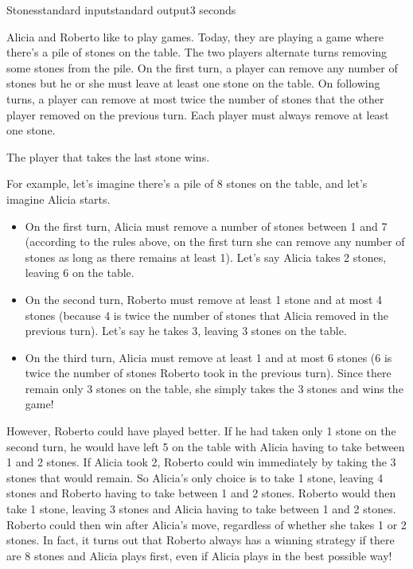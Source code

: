 \begin{problem}{Stones}{standard input}{standard output}{3 seconds}

Alicia and Roberto like to play games. Today, they are playing a game where there's a pile of stones on the table. The two players alternate turns removing some stones from the pile. On the first turn, a player can remove any number of stones but he or she must leave at least one stone on the table. On following turns, a player can remove at most twice the number of stones that the other player removed on the previous turn. Each player must always remove at least one stone.

The player that takes the last stone wins.

For example, let's imagine there's a pile of 8 stones on the table, and let's imagine Alicia starts.

\begin{itemize}
  \item{On the first turn, Alicia must remove a number of stones between 1 and 7 (according to the rules above, on the first turn she can remove any number of stones as long as there remains at least 1). Let's say Alicia takes 2 stones, leaving 6 on the table.}
  \item{On the second turn, Roberto must remove at least 1 stone and at most 4 stones (because 4 is twice the number of stones that Alicia removed in the previous turn). Let's say he takes 3, leaving 3 stones on the table.}
  \item{On the third turn, Alicia must remove at least 1 and at most 6 stones (6 is twice the number of stones Roberto took in the previous turn). Since there remain only 3 stones on the table, she simply takes the 3 stones and wins the game!}
\end{itemize}

However, Roberto could have played better. If he had taken only 1 stone on the second turn, he would have left 5 on the table with Alicia having to take between 1 and 2 stones. If Alicia took 2, Roberto could win immediately by taking the 3 stones that would remain. So Alicia's only choice is to take 1 stone, leaving 4 stones and Roberto having to take between 1 and 2 stones. Roberto would then take 1 stone, leaving 3 stones and Alicia having to take between 1 and 2 stones. Roberto could then win after Alicia's move, regardless of whether she takes 1 or 2 stones. In fact, it turns out that Roberto always has a winning strategy if there are 8 stones and Alicia plays first, even if Alicia plays in the best possible way!


\end{problem}
